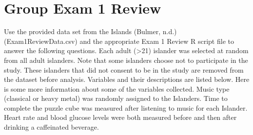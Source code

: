 \documentclass[
]{report}
\begin{document}
\vspace{0.6in}

\newpage

\section{Group Exam 1 Review}\label{group-exam-1-review}

Use the provided data set from the Islands (Bulmer, n.d.) (Exam1ReviewData.csv) and the appropriate Exam 1 Review R script file to answer the following questions. Each adult (\textgreater21) islander was selected at random from all adult islanders. Note that some islanders choose not to participate in the study. These islanders that did not consent to be in the study are removed from the dataset before analysis. Variables and their descriptions are listed below. Here is some more information about some of the variables collected. Music type (classical or heavy metal) was randomly assigned to the Islanders. Time to complete the puzzle cube was measured after listening to music for each Islander. Heart rate and blood glucose levels were both measured before and then after drinking a caffeinated beverage.
\end{document}
